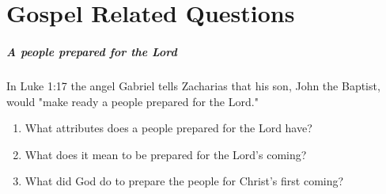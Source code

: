 \chapter{Gospel Related Questions}

\paragraph{A people prepared for the Lord}
In Luke 1:17 the angel Gabriel tells Zacharias that his son, John the Baptist, would "make ready a people prepared for the Lord."
\begin{enumerate}
  \item What attributes does a people prepared for the Lord have?
  \item What does it mean to be prepared for the Lord's coming?
  \item What did God do to prepare the people for Christ's first coming?
\end{enumerate}
